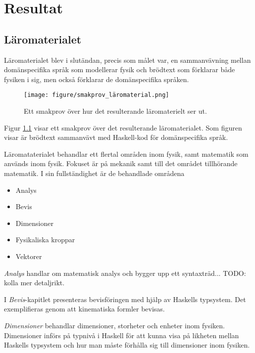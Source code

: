 
\chapter{Resultat}

\begin{binge}

\section{Läromaterialet}

Läromaterialet blev i slutändan, precis som målet var, en sammanvävning mellan domänspecifika språk som modellerar fysik och brödtext som förklarar både fysiken i sig, men också förklarar de domänspecifika språken.

\begin{figure}
  \texttt{[image: figure/smakprov\_läromaterial.png]}
  \caption{Ett smakprov över hur det resulterande läromaterielt ser ut.}
  \label{fig:smakprov_läromaterial}
\end{figure}

Figur \ref{fig:smakprov_läromaterial} visar ett smakprov över det resulterande läromaterialet. Som figuren visar är brödtext sammanvävt med Haskell-kod för domänspecifika språk.

Läromataterialet behandlar ett flertal områden inom fysik, samt matematik som används inom fysik. Fokuset är på mekanik samt till det området tillhörande matematik. I sin fullständighet är de behandlade områdena

\begin{itemize}
  \item Analys
  \item Bevis
  \item Dimensioner
  \item Fysikaliska kroppar
  \item Vektorer
\end{itemize}

\textit{Analys} handlar om matematisk analys och bygger upp ett syntaxträd... TODO: kolla mer detaljrikt.

I \textit{Bevis}-kapitlet presenteras bevisföringen med hjälp av Haskells typsystem. Det exemplifieras genom att kinematiska formler bevisas.

\textit{Dimensioner} behandlar dimensioner, storheter och enheter inom fysiken. Dimensioner införs på typnivå i Haskell för att kunna visa på likheten mellan Haskells typsystem och hur man måste förhålla sig till dimensioner inom fysiken.


\end{binge}
